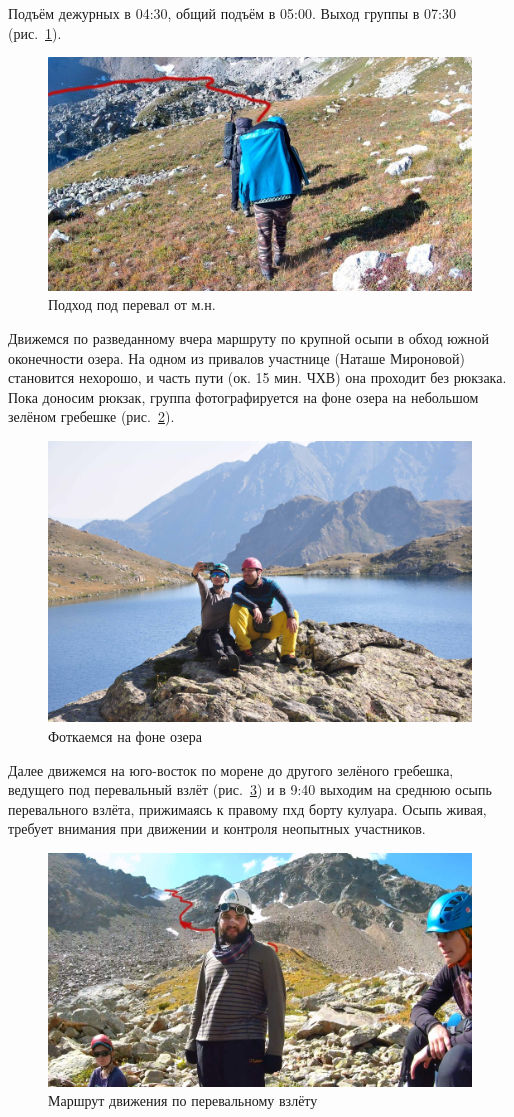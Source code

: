 Подъём дежурных в 04:30, общий подъём в 05:00. Выход группы в 07:30 (рис.~\ref{fig:20aug1.jpg}).

\begin{figure}[h!]
	\centering
	\includegraphics[width=0.7\linewidth]{../pics/20aug1.jpg}
	\caption{Подход под перевал от м.н.}
	\label{fig:20aug1.jpg}
\end{figure}


 Движемся по разведанному вчера маршруту по крупной осыпи в обход южной оконечности озера. На одном из привалов участнице (Наташе Мироновой) становится нехорошо, и часть пути (ок. 15 мин. ЧХВ) она проходит без рюкзака. Пока доносим рюкзак, группа фотографируется на фоне озера на небольшом зелёном гребешке (рис.~\ref{fig:DSC_0907}).
 
 \begin{figure}[h!]
 	\centering
 	\includegraphics[width=0.7\linewidth]{../pics/DSC_0907}
 	\caption{Фоткаемся на фоне озера}
 	\label{fig:DSC_0907}
 \end{figure}
 

Далее движемся на юго-восток по морене до другого зелёного гребешка, ведущего под перевальный взлёт (рис.~\ref{fig:20aug2.jpg}) и в 9:40 выходим на среднюю осыпь перевального взлёта, прижимаясь к правому пхд борту кулуара. Осыпь живая, требует внимания при движении и контроля неопытных участников.

\begin{figure}[h!]
	\centering
	\includegraphics[width=0.7\linewidth]{../pics/20aug2.jpg}
	\caption{Маршрут движения по перевальному взлёту}
	\label{fig:20aug2.jpg}
\end{figure}

